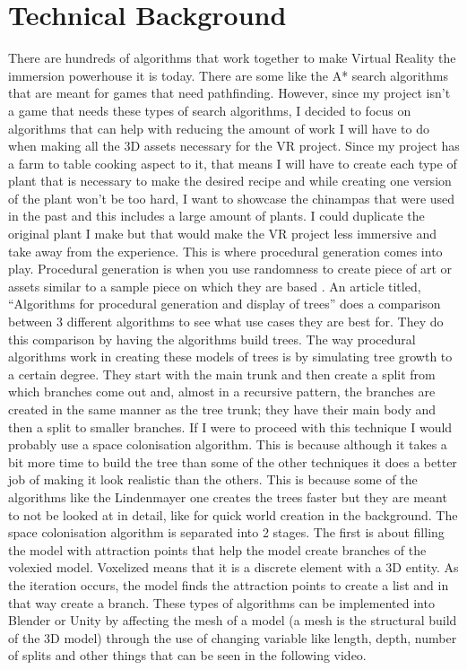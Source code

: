 \documentclass[12pt,twocolumn]{article}
\begin{document}
\section{Technical Background}
There are hundreds of algorithms that work together to make Virtual Reality the immersion powerhouse it is today. There are some like the A* search algorithms that are meant for games that need pathfinding. However, since my project isn’t a game that needs these types of search algorithms, I decided to focus on algorithms that can help with reducing the amount of work I will have to do when making all the 3D assets necessary for the VR project. Since my project has a farm to table cooking aspect to it, that means I will have to create each type of plant that is necessary to make the desired recipe and while creating one version of the plant won’t be too hard, I want to showcase the chinampas that were used in the past and this includes a large amount of plants. I could duplicate the original plant I make but that would make the VR project less immersive and take away from the experience. This is where procedural generation comes into play. Procedural generation is when you use randomness to create piece of art or assets similar to a sample piece on which they are based \cite{buildproceduralgen2016}. An article titled, “Algorithms for procedural generation and display of trees” does a comparison between 3 different algorithms to see what use cases they are best for\cite{proceduralgen2019}. They do this comparison by having the algorithms build trees. The way procedural algorithms work in creating these models of trees is by simulating tree growth to a certain degree. They start with the main trunk and then create a split from which branches come out and, almost in a recursive pattern, the branches are created in the same manner as the tree trunk; they have their main body and then a split to smaller branches. If I were to proceed with this technique I would probably use a space colonisation algorithm. This is because although it takes a bit more time to build the tree than some of the other techniques it does a better job of making it look realistic than the others. This is because some of the algorithms like the Lindenmayer one creates the trees faster but they are meant to not be looked at in detail, like for quick world creation in the background. The space colonisation algorithm is separated into 2 stages. The first is about filling the model with attraction points that help the model create branches of the volexied model. Voxelized means that it is a discrete element with a 3D entity. As the iteration occurs, the model finds the attraction points to create a list and in that way create a branch. These types of algorithms can be implemented into Blender or Unity by affecting the mesh of a model (a mesh is the structural build of the 3D model) through the use of changing variable like length, depth,  number of splits and other things that can be seen in the following video.
\end{document}
